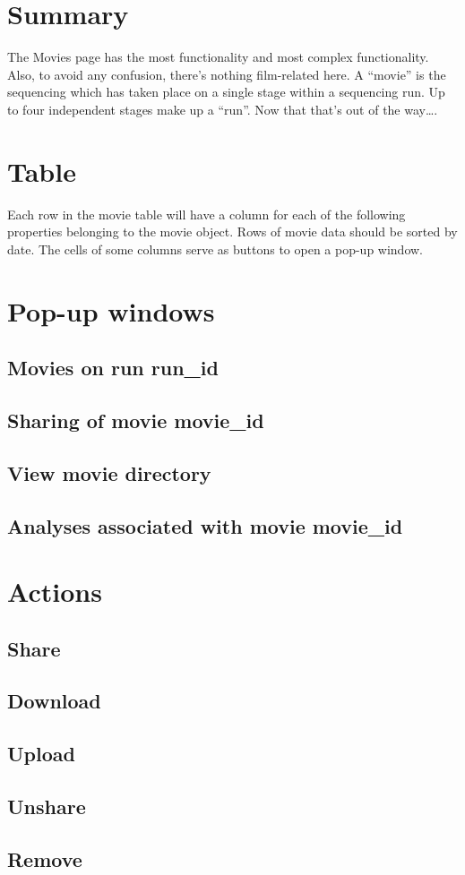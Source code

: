 
\section{Summary}
The Movies page has the most functionality and most complex functionality. Also, 
to avoid any confusion, there's nothing film-related here. A ``movie'' is the 
sequencing which has taken place on a single stage within a sequencing run. Up 
to four independent stages make up a ``run''. Now that that's out of the way….

\section{Table}
Each row in the movie table will have a column for each of the following properties 
belonging to the movie object. Rows of movie data should be sorted by date. The 
cells of some columns serve as buttons to open a pop-up window.

\section{Pop-up windows}
\subsection{Movies on run run\_id}
\subsection{Sharing of movie movie\_id}
\subsection{View movie directory}
\subsection{Analyses associated with movie movie\_id}
\section{Actions}
\subsection{Share}
\subsection{Download}
\subsection{Upload}
\subsection{Unshare}
\subsection{Remove}

